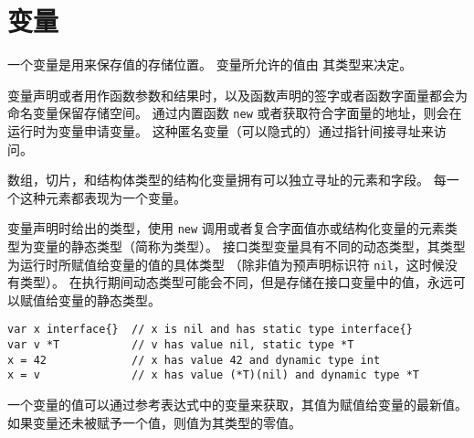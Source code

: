 
\chapter{变量}
一个变量是用来保存值的存储位置。
变量所允许的值由 其类型来决定。

变量声明或者用作函数参数和结果时，以及函数声明的签字或者函数字面量都会为命名变量保留存储空间。
通过内置函数 \lstinline|new| 或者获取符合字面量的地址，则会在运行时为变量申请变量。
这种匿名变量（可以隐式的）通过指针间接寻址来访问。%

数组，切片，和结构体类型的结构化变量拥有可以独立寻址的元素和字段。
每一个这种元素都表现为一个变量。 

变量声明时给出的类型，使用 \lstinline|new| 调用或者复合字面值亦或结构化变量的元素类型为变量的静态类型（简称为类型）。
接口类型变量具有不同的动态类型，其类型为运行时所赋值给变量的值的具体类型
（除非值为预声明标识符 \lstinline|nil|，这时候没有类型）。
在执行期间动态类型可能会不同，但是存储在接口变量中的值，永远可以赋值给变量的静态类型。
\begin{lstlisting}[style=golang]
var x interface{}  // x is nil and has static type interface{}
var v *T           // v has value nil, static type *T
x = 42             // x has value 42 and dynamic type int
x = v              // x has value (*T)(nil) and dynamic type *T
\end{lstlisting}
一个变量的值可以通过参考表达式中的变量来获取，其值为赋值给变量的最新值。
如果变量还未被赋予一个值，则值为其类型的零值。
